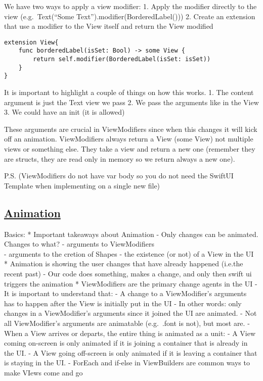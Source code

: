 \documentclass[]{article}
\begin{document}
We have two ways to apply a view modifier: 1. Apply the modifier
directly to the view (e.g.~Text(``Some
Text'').modifier(BorderedLabel())) 2. Create an extension that use a
modifier to the View itself and return the View modified

\begin{verbatim}
extension View{
    func borderedLabel(isSet: Bool) -> some View {
        return self.modifier(BorderedLabel(isSet: isSet))
    }
}
\end{verbatim}

It is important to highlight a couple of things on how this works. 1.
The content argument is just the Text view we pass 2. We pass the
arguments like in the View 3. We could have an init (it is allowed)

These arguments are crucial in ViewModifiers since when this changes it
will kick off an animation. ViewModifiers always return a View (some
View) not multiple views or something else. They take a view and return
a new one (remember they are structs, they are read only in memory so we
return always a new one).

P.S. (ViewModifiers do not have var body so you do not need the SwiftUI
Template when implementing on a single new file)

\hypertarget{animation-1}{%
\subsection{\texorpdfstring{\href{https://www.youtube.com/watch?v=PoeaUMGAx6c}{Animation}}{Animation}}\label{animation-1}}

Basics: * Important takeaways about Animation - Only changes can be
animated. Changes to what? - arguments to ViewModifiers\\
- arguments to the cretion of Shapes - the existence (or not) of a View
in the UI * Animation is showing the user changes that have already
happened (i.e.the recent past) - Our code does something, makes a
change, and only then swift ui triggers the animation * ViewModifiers
are the primary change agents in the UI - It is important to understand
that: - A change to a ViewModifier's arguments has to happen after the
View is initially put in the UI - In other words: only changes in a
ViewModifier's arguments since it joined the UI are animated. - Not all
ViewModifier's arguments are animatable (e.g.~.font is not), but most
are. - When a View arrives or departs, the entire thing is animated as a
unit: - A View coming on-screen is only animated if it is joining a
container that is already in the UI. - A View going off-screen is only
animated if it is leaving a container that is staying in the UI. -
ForEach and if-else in ViewBuilders are common ways to make VIews come
and go
\end{document}
